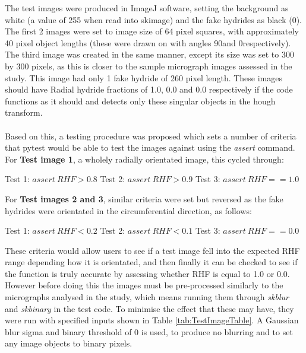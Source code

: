 \documentclass{article}
\begin{document}
    \noindent The test images were produced in ImageJ software, setting the background as white (a value of 255 when read into skimage) and the fake hydrides as black (0). The first 2 images were set to image size of 64 pixel squares, with approximately 40 pixel object lengths (these were drawn on with angles 90\textdegree and 0\textdegree respectively). The third image was created in the same manner, except its size was set to 300 by 300 pixels, as this is closer to the sample micrograph images assessed in the study. This image had only 1 fake hydride of 260 pixel length. These images should have Radial hydride fractions of 1.0, 0.0 and 0.0 respectively if the code functions as it should and detects only these singular objects in the hough transform.
    \\
    \\
    Based on this, a testing procedure was proposed which sets a number of criteria that pytest would be able to test the images against using the \textit{assert} command. For \textbf{Test image 1}, a wholely radially orientated image, this cycled through:

    \begin{center}
        Test 1: $assert\:RHF > 0.8$ \newline
        Test 2: $assert\:RHF > 0.9$ \newline
        Test 3: $assert\:RHF == 1.0$ \newline
    \end{center}

    \noindent For \textbf{Test images 2 and 3}, similar criteria were set but reversed as the fake hydrides were orientated in the circumferential direction, as follows:
    \begin{center}
        Test 1: $assert\:RHF < 0.2$ \newline
        Test 2: $assert\:RHF < 0.1$ \newline
        Test 3: $assert\:RHF == 0.0$ \newline 
    \end{center}

    \noindent These criteria would allow users to see if a test image fell into the expected RHF range depending how it is orientated, and then finally it can be checked to see if the function is truly accurate by assessing whether RHF is equal to 1.0 or 0.0.  However before doing this the images must be pre-processed similarly to the micrographs analysed in the study, which means running them through \textit{skblur} and \textit{skbinary} in the test code. To minimise the effect that these may have, they were run with specified inputs shown in Table \ref{tab:TestImageTable}. A Gaussian blur sigma and binary threshold of 0 is used, to produce no blurring and to set any image objects to binary pixels.
\end{document}
